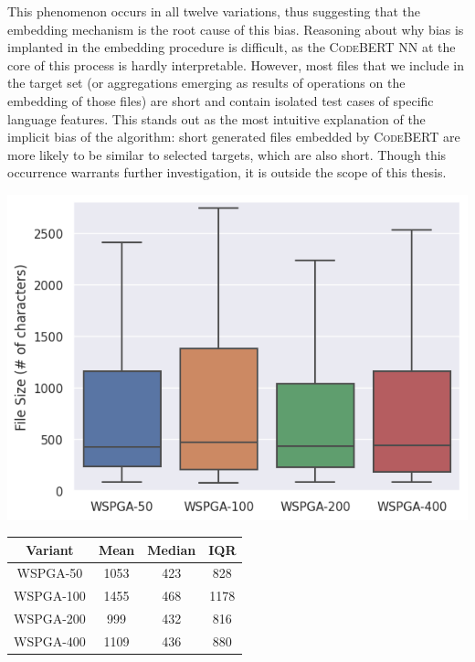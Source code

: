 This phenomenon occurs in all twelve variations, thus suggesting
that the embedding mechanism is the root cause of this bias.
Reasoning about why bias is implanted in the embedding
procedure is difficult, as the \textsc{CodeBERT} \gls{NN} at the core of this process
is hardly interpretable.
However, most files that we include in the target set (or aggregations
emerging as results of operations on the embedding of those files)
are short and contain isolated test cases of specific language features.
This stands out as the most intuitive explanation of the implicit bias
of the algorithm: short generated files embedded by \textsc{CodeBERT} are more likely
to be similar to selected targets, which are also short.
Though this occurrence warrants further investigation, it is outside the scope of this thesis.

\begin{minipage}{\textwidth}
\vspace{0.25cm}
  \begin{minipage}[b]{0.49\textwidth}
    \centering
    \includegraphics[scale=0.4]{img/rq1-3/rq1-3-size-dist3.png}
    \label{fig:rq1-3size-dist3}
  \end{minipage}
  \hfill
  \begin{minipage}[b]{0.49\textwidth}
    \centering
\begin{tabular}{c|ccc}
    Variant & Mean & Median & \gls{IQR}\\
    \midrule
    \gls{WSPGA}-50 & 1053 & 423 & 828\\
    \gls{WSPGA}-100 & 1455 & 468 & 1178\\
    \gls{WSPGA}-200 & 999 & 432 & 816\\
    \gls{WSPGA}-400 & 1109 & 436 & 880\\
\end{tabular}
\vfill
  \label{tab:rq1-3size-dist3}
\end{minipage}
\vspace{0.25cm}
\end{minipage}


